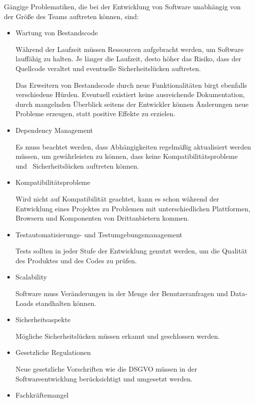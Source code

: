 \documentclass[acmtog, language=ngerman]{acmart}
\begin{document}
Gängige Problematiken, die bei der Entwicklung von Software unabhängig von der Größe des Teams auftreten können, sind: 
\begin{itemize}
\item Wartung von Bestandscode

Während der Laufzeit müssen Ressourcen aufgebracht werden, um Software lauffähig zu halten. Je länger die Laufzeit, desto höher das Risiko, dass der Quellcode veraltet und eventuelle Sicherheitslücken auftreten. 

Das Erweitern von Bestandscode durch neue Funktionalitäten birgt ebenfalls verschiedene Hürden. Eventuell existiert keine ausreichende Dokumentation, durch mangelnden Überblick seitens der Entwickler können Änderungen neue Probleme erzeugen, statt positive Effekte zu erzielen.

\item Dependency Management

Es muss beachtet werden, dass Abhängigkeiten regelmäßig aktualisiert werden müssen, um gewährleisten zu können, dass keine Kompatibilitätsprobleme und  Sicherheitslücken auftreten können.

\item Kompatibilitätsprobleme

Wird nicht auf Kompatibilität geachtet, kann es schon während der Entwicklung eines Projektes zu Problemen mit unterschiedlichen Plattformen, Browsern und Komponenten von Drittanbietern kommen. 

\item Testautomatisierungs- und Testumgebungsmanagement

Tests sollten in jeder Stufe der Entwicklung genutzt werden, um die Qualität des Produktes und des Codes zu prüfen.

\item Scalability

Software muss Veränderungen in der Menge der Benutzeranfragen und Data-Loads standhalten können.

\item Sicherheitsaspekte

Mögliche Sicherheitslücken müssen erkannt und geschlossen werden.

\item Gesetzliche Regulationen

Neue gesetzliche Vorschriften wie die DSGVO müssen in der Softwareentwicklung berücksichtigt und umgesetzt werden.

\item Fachkräftemangel


\end{itemize}
\end{document}
